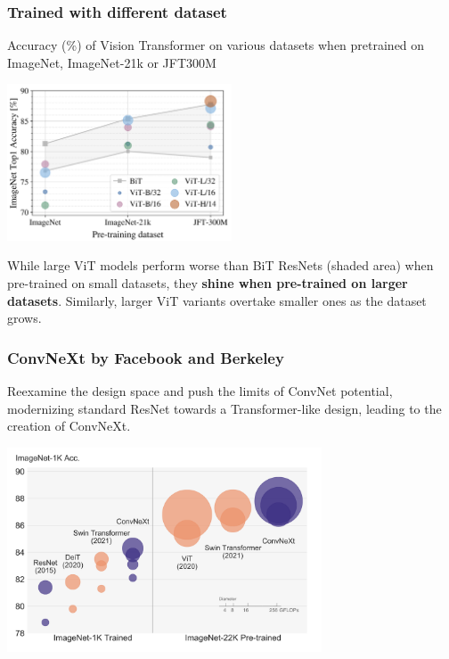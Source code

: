 \begin{frame}
\frametitle{Trained with different dataset}
Accuracy (\%) of Vision Transformer on various datasets when pretrained on ImageNet, ImageNet-21k or JFT300M
\begin{center}
    \includegraphics[width=0.5\textwidth]{img/3-section/Pretraining image.png} 
\end{center}
While large ViT models perform worse than BiT ResNets (shaded area) when pre-trained on small datasets, they \textbf{shine when pre-trained on larger datasets}. Similarly, larger ViT variants overtake smaller ones as the dataset grows.

\end{frame}


\begin{frame}
\frametitle{ConvNeXt by Facebook and Berkeley}
Reexamine the design space and push the limits of ConvNet potential, modernizing  standard ResNet towards a Transformer-like design, leading to the creation of ConvNeXt.

\begin{center}
    \includegraphics[width=0.7\textwidth]{img/3-section/ConvNext.png} 
\end{center}

\end{frame}

